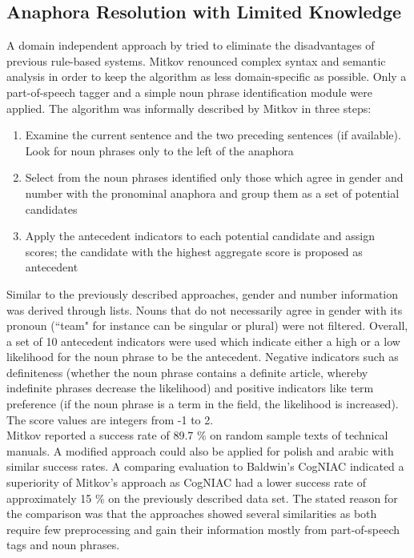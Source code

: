 \subsection{Anaphora Resolution with Limited Knowledge}
\label{anaphoraLimitedKnowledgeSection}
A domain independent approach by \cite{mitkov1998robust} tried to eliminate the disadvantages of previous rule-based systems. Mitkov renounced complex syntax and semantic analysis in order to keep the algorithm as less domain-specific as possible. Only a part-of-speech tagger and a simple noun phrase identification module were applied. The algorithm was informally described by Mitkov in three steps:
\begin{enumerate} 
\item Examine the current sentence and the two preceding sentences (if available). Look for noun phrases only to the left of the anaphora
\item Select from the noun phrases identified only those which agree in gender and number with the pronominal anaphora and group them as a set of potential candidates
\item Apply the antecedent indicators to each potential candidate and assign scores; the candidate with the highest aggregate score is proposed as antecedent
\end{enumerate}
Similar to the previously described approaches, gender and number information was derived through lists. Nouns that do not necessarily agree in gender with its pronoun (``team" for instance can be singular or plural) were not filtered.
Overall, a set of 10 antecedent indicators were used which indicate either a high or a low likelihood for the noun phrase to be the antecedent. Negative indicators such as definiteness (whether the noun phrase contains a definite article, whereby indefinite phrases decrease the likelihood) and positive indicators like term preference (if the noun phrase is a term in the field, the likelihood is increased). The score values are integers from -1 to 2. \\
Mitkov reported a success rate of 89.7 \% on random sample texts of technical manuals. A modified approach could also be applied for polish \citep{mitkov2000robust} and arabic \citep{mitkov1998multilingual} with similar success rates.
A comparing evaluation to Baldwin's CogNIAC \citep{baldwin1997cogniac} indicated a superiority of Mitkov's approach \citep{mitkov1998robust} as CogNIAC had a lower success rate of approximately 15 \% on the previously described data set. The stated reason for the comparison was that the approaches showed several similarities as both require few preprocessing and gain their information mostly from part-of-speech tags and noun phrases.\\
